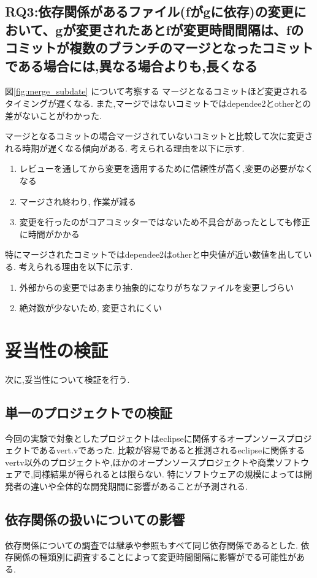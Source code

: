 \documentclass{fose2016}           %
\begin{document}
\subsection{RQ3:依存関係があるファイル(fがgに依存)の変更において、gが変更されたあとfが変更時間間隔は、fのコミットが複数のブランチのマージとなったコミットである場合には,異なる場合よりも,長くなる}
図\ref{fig:merge_subdate} について考察する
マージとなるコミットほど変更されるタイミングが遅くなる.
また,マージではないコミットではdependee2とotherとの差がないことがわかった.


マージとなるコミットの場合マージされていないコミットと比較して次に変更される時期が遅くなる傾向がある.
考えられる理由を以下に示す.
\begin{enumerate}
\item レビューを通してから変更を適用するために信頼性が高く,変更の必要がなくなる
\item マージされ終わり, 作業が減る
\item 変更を行ったのがコアコミッターではないため不具合があったとしても修正に時間がかかる
\end{enumerate}

特にマージされたコミットではdependee2はotherと中央値が近い数値を出している.
考えられる理由を以下に示す.
\begin{enumerate}
\item 外部からの変更ではあまり抽象的になりがちなファイルを変更しづらい
\item 絶対数が少ないため, 変更されにくい
\end{enumerate}

\section{妥当性の検証}\label{妥当性の検証}
次に,妥当性について検証を行う.

\subsection*{単一のプロジェクトでの検証}
今回の実験で対象としたプロジェクトはeclipseに関係するオープンソースプロジェクトであるvert.vであった.
比較が容易であると推測されるeclipseに関係するvertv以外のプロジェクトや,ほかのオープンソースプロジェクトや商業ソフトウェアで,同様結果が得られるとは限らない.
特にソフトウェアの規模によっては開発者の違いや全体的な開発期間に影響があることが予測される.

\subsection*{依存関係の扱いについての影響}
依存関係についての調査では継承や参照もすべて同じ依存関係であるとした.
依存関係の種類\cite{Kotani}別に調査することによって変更時間間隔に影響がでる可能性がある.
\end{document}
